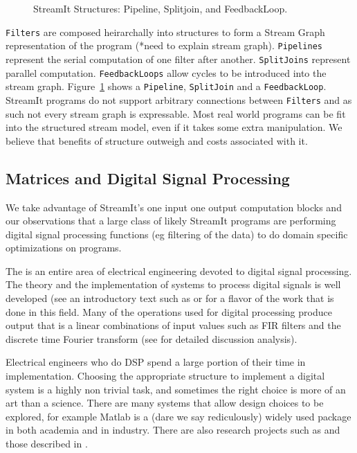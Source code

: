 \begin{figure}
\center
\epsfxsize=2.5in
\caption{StreamIt Structures: Pipeline, Splitjoin, and FeedbackLoop.}
\label{fig:structures}
\end{figure}


{\tt Filters} are composed heirarchally into structures to form
a Stream Graph representation of the program (*need to explain stream graph). 
{\tt Pipelines} represent the serial computation of one filter after another.
{\tt SplitJoins} represent parallel computation. {\tt FeedbackLoops} allow cycles
to be introduced into the stream graph. Figure~\ref{fig:structures} shows a {\tt Pipeline},
{\tt SplitJoin} and a {\tt FeedbackLoop}. StreamIt programs do not support arbitrary connections
between {\tt Filters} and as such not every stream graph is expressable. Most real world programs
can be fit into the structured stream model, even if it takes some extra manipulation. We believe
that benefits of structure outweigh and costs associated with it.

\subsection{Matrices and Digital Signal Processing}
We take advantage of StreamIt's one input one output computation blocks and 
our observations that a large class of likely StreamIt programs are performing
digital signal processing functions (eg filtering of the data) to do domain specific
optimizations on programs.

The is an entire area of electrical engineering devoted to digital signal processing. The
theory and the implementation of systems to process digital signals is well developed (see
an introductory text such as\cite{oppenheim-discrete} or \cite{lyons-understanding} for 
a flavor of the work that is done in this field. Many of the operations used for digital 
processing produce output that is a linear combinations of input values such as FIR filters and
the discrete time Fourier transform (see \cite{oppenheim-discrete} for detailed discussion
analysis).

Electrical engineers who do DSP spend a large portion of their time in implementation. Choosing
the appropriate structure to implement a digital system is a highly non trivial task, and sometimes
the right choice is more of an art than a science. There are many systems that allow design choices
to be explored, for example Matlab\cite{matlab} is a (dare we say rediculously) widely used package 
in both academia and in industry. There are also research projects such as \cite{covell-ade} 
and those described in \cite{oppenheim-symbolic}. 

